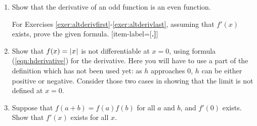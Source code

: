{\begin{enumerate}[item-label={\bfseries \arabic*.}]
 interval $(a,b)$ and $f(x) < g(x)$ for all $x$ in $(a,b)$, then $f'(x) < g'(x)$
 for all $x$ in $(a,b)$. If true, prove it; if false, give a counterexample.
 Would your answer change if the restriction of $x$ to $(a,b)$ were removed and
 all real $x$ were used instead?
 \item Show that the derivative of an odd function is an even function.
\par\noindent For Exercises \ref{exer:altderivfirst}-\ref{exer:altderivlast},
assuming that $f'(x)$ exists, prove the given formula.
[item-label={{[\bfseries \arabic*.]}}]
 \vspace{2mm}
 \vspace{2mm}
 \item Show that $f(x) = \lvert\mspace{1mu}x\mspace{1mu}\rvert$ is not differentiable at $x=0$, using formula
 (\ref{eqn:hderivative}) for the derivative. Here you will have to use a part of
 the definition which has not been used yet: as $h$ approaches 0, $h$
 can be either positive or negative. Consider those two cases in showing that
 the limit is not defined at $x=0$.
 \item Suppose that $f(a+b) = f(a)f(b)$ for all $a$ and $b$, and
 $f'(0)$ exists. Show that $f'(x)$ exists for all $x$.
\end{enumerate}}
\newpage
